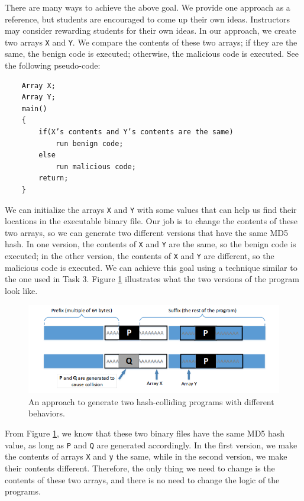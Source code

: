\documentclass[a4paper]{article}
\begin{document}
There are many ways to achieve the above goal. We provide one approach as a reference, but students are encouraged to come up their own ideas. Instructors may consider rewarding students for their own ideas. In our approach, we create two arrays \texttt{X} and \texttt{Y}. We compare the contents of these two arrays; if they are the same, the benign code is executed; otherwise, the malicious code is executed. See the following pseudo-code:

\begin{verbatim}
    Array X;
    Array Y;
    main()
    {
        if(X’s contents and Y’s contents are the same)
            run benign code;
        else
            run malicious code;
        return;
    }
\end{verbatim}

We can initialize the arrays \texttt{X} and \texttt{Y} with some values that can help us find their locations in the executable binary file. Our job is to change the contents of these two arrays, so we can generate two different versions that have the same MD5 hash. In one version, the contents of \texttt{X} and \texttt{Y} are the same, so the benign code is executed; in the other version, the contents of \texttt{X} and \texttt{Y} are different, so the malicious code is executed. We can achieve this goal using a technique similar to the one used in Task 3. Figure \ref{fig:behaviorprog} illustrates what the two versions of the program look like.

\begin{figure}[h]
    \centering
    \includegraphics[width=\textwidth]{behaviorprog.png}
    \caption{An approach to generate two hash-colliding programs with different behaviors.}
    \label{fig:behaviorprog}
\end{figure}

From Figure \ref{fig:behaviorprog}, we know that these two binary files have the same MD5 hash value, as long as \texttt{P} and \texttt{Q} are generated accordingly. In the first version, we make the contents of arrays \texttt{X} and \texttt{y} the same, while in the second version, we make their contents different. Therefore, the only thing we need to change is the contents of these two arrays, and there is no need to change the logic of the programs.
\end{document}
